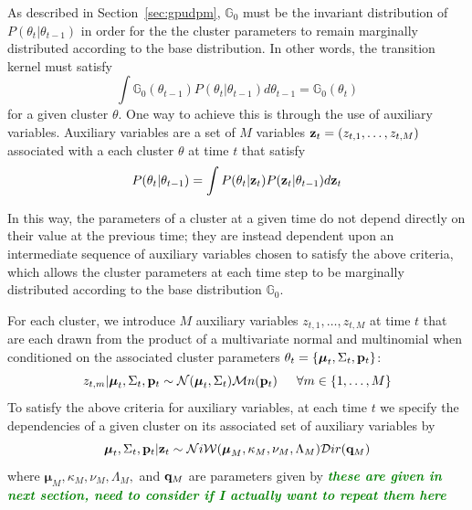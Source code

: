 \documentclass[smallcondensed, final]{svjour3}
\newcommand{\willie}[1]{\textcolor{green}{\textsf{\emph{\textbf{\textcolor{green}{#1}}}}}}
\begin{document}
As described in Section~\ref{sec:gpudpm}, $\mathbb{G}_{0}$ must be the invariant distribution of $P(\theta_{t} | \theta_{t-1})$ in order for the the cluster parameters to remain marginally distributed according to the base distribution. In other words, the transition kernel must satisfy
\begin{equation}
\int \mathbb{G}_{0}(\theta_{t-1})P(\theta_{t} | \theta_{t-1}) d\theta_{t-1} = \mathbb{G}_{0}(\theta_{t})
\end{equation}
for a given cluster $\theta$. One way to achieve this is through the use of auxiliary variables. Auxiliary variables are a set of $M$ variables $\bold{z}_{t} = (z_{t,1}, \ldots, z_{t,M})$ associated with a each cluster $\theta$ at time $t$ that satisfy
\begin{eqnarray}
P(\theta_{t} | \theta_{t-1}) = \int P(\theta_{t} | \bold{z}_{t}) P(\bold{z}_{t} | \theta_{t-1}) d \bold{z}_{t}  %
\end{eqnarray}

In this way, the parameters of a cluster at a given time do not depend directly on their value at the previous time; they are instead dependent upon an intermediate sequence of auxiliary variables chosen to satisfy the above criteria, which allows the cluster parameters at each time step to be marginally distributed according to the base distribution $\mathbb{G}_{0}$.

For each cluster, we introduce $M$ auxiliary variables $z_{t, 1}, \ldots, z_{t, M}$ at time $t$ that are each drawn from the product of a multivariate normal and multinomial when conditioned on the associated cluster parameters $\theta_{t} = \{ \boldsymbol{\mu}_{t}, \Sigma_{t}, \bold{p}_{t} \}$:
\begin{equation} \label{transker1}
z_{t, m} | \boldsymbol{\mu}_{t}, \Sigma_{t}, \bold{p}_{t}  \sim  \mathcal{N}(\boldsymbol{\mu}_{t}, \Sigma_{t}) \mathcal{M}n(\bold{p}_{t})   \hspace{15pt}   
\forall m \in \{ 1, \ldots, M \}
\end{equation}
To satisfy the above criteria for auxiliary variables, at each time $t$ we specify the dependencies of a given cluster on its associated set of auxiliary variables by
\begin{equation} \label{transker2}
\boldsymbol{\mu}_{t}, \Sigma_{t}, \bold{p}_{t} | \bold{z}_t  \sim  \mathcal{N}i\mathcal{W}(\boldsymbol{\mu}_{M}, \kappa_{M}, \nu_{M}, \Lambda_{M})  \mathcal{D}ir(\bold{q}_{M})
\end{equation}
where $\boldsymbol{\mu}_{M}, \kappa_{M}, \nu_{M}, \Lambda_{M},$ and $\bold{q}_{M}$ are parameters given by
\willie{these are given in next section, need to consider if I actually want to repeat them here}
\end{document}
